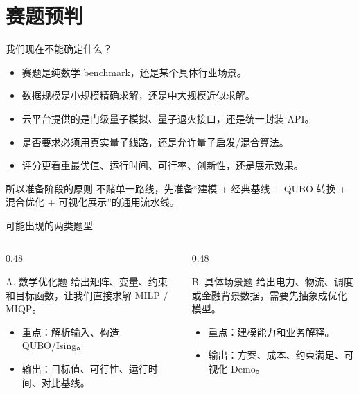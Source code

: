 \documentclass[aspectratio=169]{beamer}
\begin{document}
\section{赛题预判}

\begin{frame}{我们现在不能确定什么？}
\small
\begin{itemize}
  \item 赛题是纯数学 benchmark，还是某个具体行业场景。
  \item 数据规模是小规模精确求解，还是中大规模近似求解。
  \item 云平台提供的是门级量子模拟、量子退火接口，还是统一封装 API。
  \item 是否要求必须用真实量子线路，还是允许量子启发/混合算法。
  \item 评分更看重最优值、运行时间、可行率、创新性，还是展示效果。
\end{itemize}

\begin{block}{所以准备阶段的原则}
  不赌单一路线，先准备“建模 + 经典基线 + QUBO 转换 + 混合优化 + 可视化展示”的通用流水线。
\end{block}
\end{frame}

\begin{frame}{可能出现的两类题型}
\small
\begin{columns}[T]
\begin{column}{0.48\textwidth}
\begin{block}{A. 数学优化题}
  给出矩阵、变量、约束和目标函数，让我们直接求解 MILP / MIQP。
\end{block}
\begin{itemize}
  \item 重点：解析输入、构造 QUBO/Ising。
  \item 输出：目标值、可行性、运行时间、对比基线。
\end{itemize}
\end{column}

\begin{column}{0.48\textwidth}
\begin{block}{B. 具体场景题}
  给出电力、物流、调度或金融背景数据，需要先抽象成优化模型。
\end{block}
\begin{itemize}
  \item 重点：建模能力和业务解释。
  \item 输出：方案、成本、约束满足、可视化 Demo。
\end{itemize}
\end{column}
\end{columns}
\end{frame}
\end{document}
